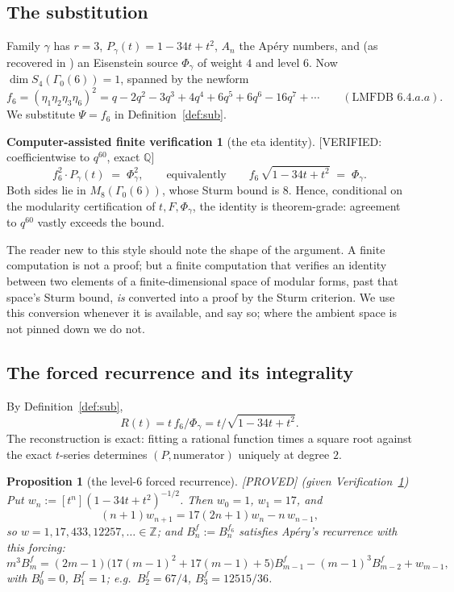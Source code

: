 \documentclass[11pt,reqno]{amsart}
\theoremstyle{plain}
\newtheorem{proposition}[theorem]{Proposition}
\theoremstyle{definition}
\newtheorem{verification}[theorem]{Computer-assisted finite verification}
\theoremstyle{remark}
\newcommand{\Z}{\mathbb{Z}}
\newcommand{\Q}{\mathbb{Q}}
\newcommand{\Proved}{\textup{\textsf{[PROVED]}}}
\newcommand{\VerifiedR}[1]{\textup{\textsf{[VERIFIED: #1]}}}
\begin{document}
\subsection{The substitution}
Family $\gamma$ has $r=3$, $P_\gamma(t)=1-34t+t^2$, $A_n$ the Ap\'ery
numbers, and (as recovered in \cite{philedger}) an Eisenstein source
$\Phi_\gamma$ of weight $4$ and level $6$. Now $\dim S_4(\Gamma_0(6))=1$,
spanned by the newform
\[
f_6=(\eta_1\eta_2\eta_3\eta_6)^2=q-2q^2-3q^3+4q^4+6q^5+6q^6-16q^7+\cdots
\qquad(\text{LMFDB }6.4.a.a).
\]
We substitute $\Psi=f_6$ in Definition~\ref{def:sub}.

\begin{verification}[the eta identity]\label{ver:eta6}
\VerifiedR{coefficientwise to $q^{60}$, exact $\Q$}
\[
f_6^2\cdot P_\gamma(t)\;=\;\Phi_\gamma^2 ,
\qquad\text{equivalently}\qquad
f_6\,\sqrt{1-34t+t^2}\;=\;\Phi_\gamma .
\]
Both sides lie in $M_8(\Gamma_0(6))$, whose Sturm bound is $8$. Hence,
conditional on the modularity certification of $t,F,\Phi_\gamma$, the
identity is theorem-grade: agreement to $q^{60}$ vastly exceeds the bound.
\end{verification}

The reader new to this style should note the shape of the argument. A
finite computation is not a proof; but a finite computation that verifies
an identity between two elements of a finite-dimensional space of modular
forms, past that space's Sturm bound, \emph{is} converted into a proof by
the Sturm criterion. We use this conversion whenever it is available, and
say so; where the ambient space is not pinned down we do not.

\subsection{The forced recurrence and its integrality}
By Definition~\ref{def:sub},
\[
R(t)=t\,f_6/\Phi_\gamma=t/\sqrt{1-34t+t^2}.
\]
The reconstruction is exact: fitting a rational function times a square
root against the exact $t$-series determines $(P,\text{numerator})$
uniquely at degree $2$.

\begin{proposition}[the level-$6$ forced recurrence]\label{prop:rec6}
\Proved{} \emph{(given Verification~\ref{ver:eta6})}
Put $w_n:=[t^n](1-34t+t^2)^{-1/2}$. Then $w_0=1$, $w_1=17$, and
\[
(n+1)w_{n+1}=17(2n+1)w_n-n\,w_{n-1},
\]
so $w=1,17,433,12257,\dots\in\Z$; and $B^{f}_n:=B^{f_6}_n$ satisfies
Ap\'ery's recurrence with this forcing:
\[
m^3B^{f}_m=(2m-1)\bigl(17(m-1)^2+17(m-1)+5\bigr)B^{f}_{m-1}
-(m-1)^3B^{f}_{m-2}+w_{m-1},
\]
with $B^f_0=0$, $B^f_1=1$; e.g.\ $B^f_2=67/4$, $B^f_3=12515/36$.
\end{proposition}
\end{document}
